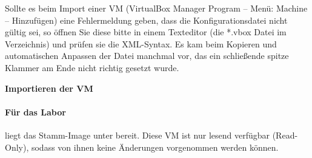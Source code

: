 \documentclass[paper=a4,fontsize=11pt]{scrartcl}%
\numberwithin{equation}{section}
\begin{document}
Sollte es beim Import einer VM (VirtualBox Manager Program -- Menü: Machine -- Hinzufügen) eine Fehlermeldung geben, dass die Konfigurationsdatei nicht gültig sei, so öffnen Sie diese bitte in einem Texteditor (die *.vbox Datei im Verzeichnis) und prüfen sie die XML-Syntax. Es kam beim Kopieren und automatischen Anpassen der Datei manchmal vor, das ein schließende spitze Klammer am Ende nicht richtig gesetzt wurde.

\begin{center}
\Large{\textbf{Importieren der VM}}
\end{center}
\paragraph{Für das Labor} liegt das Stamm-Image unter  bereit. Diese VM ist nur lesend verfügbar (Read-Only), sodass von ihnen keine Änderungen vorgenommen werden können.\\
\end{document}
